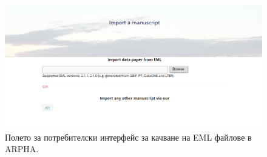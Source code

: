 \begin{figure}
\centering
\includegraphics[width=\textwidth]{Figures/user-interface}
\decoRule
\caption{Полето за потребителски интерфейс за качване на EML файлове в ARPHA.}
\label{fig:user-interface}
\end{figure}